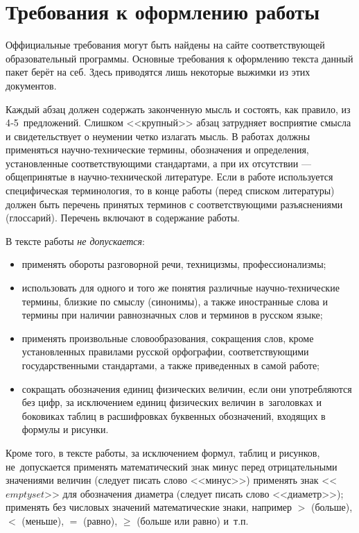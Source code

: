 \documentclass[PI,VKR]{HSEUniversity}
\begin{document}
\chapter{Требования к оформлению работы}

Оффициальные требования могут быть найдены на сайте соответствующей образовательный программы. Основные требования к оформлению текста данный пакет берёт на себ. Здесь приводятся лишь некоторые выжимки из этих документов.

Каждый абзац должен содержать законченную мысль и состоять, как правило, из 4‑5 предложений. 
Слишком <<крупный>> абзац затрудняет восприятие смысла и свидетельствует о неумении четко излагать мысль.
В работах должны применяться научно-технические термины, обозначения и определения, установленные соответствующими стандартами, а при их отсутствии --- общепринятые в научно-технической литературе. Если в работе используется специфическая терминология, то в конце работы (перед списком литературы) должен быть перечень принятых терминов с соответствующими разъяснениями (глоссарий). Перечень включают в содержание работы.

В тексте работы \emph{не допускается}:
\begin{itemize}
	\item применять обороты разговорной речи, техницизмы, профессионализмы;
	\item использовать для одного и того же понятия различные научно-технические термины, близкие по смыслу (синонимы), а также иностранные слова и термины при наличии равнозначных слов и терминов в русском языке;
	\item применять произвольные словообразования, сокращения слов, кроме установленных правилами русской орфографии, соответствующими государственными стандартами, а также приведенных в самой работе;
	\item сокращать обозначения единиц физических величин, если они употребляются без цифр, за исключением единиц физических величин в заголовках и боковиках таблиц в расшифровках буквенных обозначений, входящих в формулы и рисунки.
\end{itemize}

Кроме того, в тексте работы, за исключением формул, таблиц и рисунков, не допускается применять математический знак минус перед отрицательными значениями величин (следует писать слово <<минус>>) применять знак <<$emptyset$>> для обозначения диаметра (следует писать слово <<диаметр>>); применять без числовых значений математические знаки, например $>$ (больше), $<$ (меньше), $=$ (равно), $\geq$ (больше или равно) и т.п.
\end{document}
